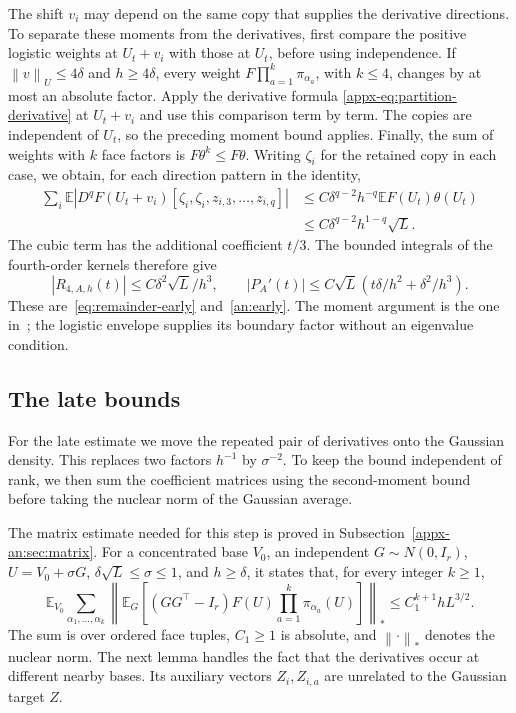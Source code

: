 \documentclass[11pt,letterpaper]{article}
\theoremstyle{remark}
\newcommand{\E}{\mathbb E}
\newcommand{\norm}[1]{\left\lVert#1\right\rVert}
\begin{document}
The shift \(v_i\) may depend on the same copy that supplies the
derivative directions. To separate these moments from the derivatives,
first compare the positive logistic weights at \(U_t+v_i\) with
those at \(U_t\), before using independence. If
\(\norm v_U\le4\delta\) and \(h\ge4\delta\), every weight
\(F\prod_{a=1}^k\pi_{\alpha_a}\), with \(k\le4\), changes by
at most an absolute factor. Apply the derivative formula
\eqref{appx-eq:partition-derivative} at \(U_t+v_i\) and use
this comparison term by term. The copies are independent of \(U_t\),
so the preceding moment bound applies. Finally,
the sum of weights with \(k\) face factors is
\(F\theta^k\le F\theta\). Writing \(\zeta_i\) for the retained
copy in each case, we obtain, for each direction pattern in the identity,
\[
 \begin{aligned}
 \sum_i\E\left|D^qF(U_t+v_i)
       [\zeta_i,\zeta_i,z_{i,3},\ldots,z_{i,q}]\right|
 &\le C\delta^{q-2}h^{-q}\E F(U_t)\theta(U_t)\\
 &\le C\delta^{q-2}h^{1-q}\sqrt L.
 \end{aligned}
\]
The cubic term has the additional coefficient \(t/3\).
The bounded integrals of the fourth-order kernels therefore give
\[
 |R_{4,A,h}(t)|\le C\delta^2\sqrt L/h^3,\qquad
 |P_A'(t)|\le C\sqrt L
       \left(t\delta/h^2+\delta^2/h^3\right).
\]
These are~\eqref{eq:remainder-early} and~\eqref{an:early}.
The moment argument is the one in~\cite[Lemma~4.1]{AL}; the
logistic envelope supplies its boundary factor without an eigenvalue
condition.

\subsection{The late bounds}
\label{appx-an:sec:restoration}

For the late estimate we move the repeated pair of derivatives onto
the Gaussian density. This replaces two factors \(h^{-1}\) by
\(\sigma^{-2}\). To keep the bound independent of rank, we then
sum the coefficient matrices using the second-moment bound before
taking the nuclear norm of the Gaussian average.

The matrix estimate needed for this step is proved in
Subsection~\ref{appx-an:sec:matrix}. For a concentrated base \(V_0\),
an independent \(G\sim N(0,I_r)\), \(U=V_0+\sigma G\),
\(\delta\sqrt L\le\sigma\le1\), and \(h\ge\delta\), it states
that, for every integer \(k\ge1\),
\begin{equation}
 \E_{V_0}\sum_{\alpha_1,\ldots,\alpha_k}
 \left\|\E_G\left[(GG^\top-I_r)F(U)
              \prod_{a=1}^k\pi_{\alpha_a}(U)\right]\right\|_*
 \le C_1^{k+1}hL^{3/2}.
 \label{appx-an:matrix-bound}
\end{equation}
The sum is over ordered face tuples, \(C_1\ge1\) is absolute,
and \(\norm{\cdot}_*\) denotes the nuclear norm. The next lemma
handles the fact that the derivatives occur at different nearby
bases. Its auxiliary vectors \(Z_i,Z_{i,a}\) are unrelated to the
Gaussian target \(Z\).
\end{document}

